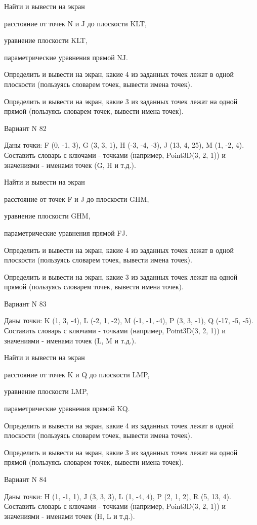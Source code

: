 \documentclass[11pt]{report}
\begin{document}
 
Найти и вывести на экран


расстояние от точек N и J до плоскости KLT,

 
уравнение плоскости KLT,

 
параметрические уравнения прямой NJ.


Определить и вывести на экран, какие 4 из заданных точек лежат в одной плоскости (пользуясь словарем точек, вывести имена точек).


Определить и вывести на экран, какие 3 из заданных точек лежат на одной прямой (пользуясь словарем точек, вывести имена точек).

Вариант N 82

Даны точки: F (0, -1, 3), G (3, 3, 1), H (-3, -4, -3), J (13, 4, 25), M (1, -2, 4).
Составить словарь с ключами - точками (например, Point3D(3, 2, 1)) и значениями - именами точек (G, H и т.д.).

 
Найти и вывести на экран


расстояние от точек F и J до плоскости GHM,

 
уравнение плоскости GHM,

 
параметрические уравнения прямой FJ.


Определить и вывести на экран, какие 4 из заданных точек лежат в одной плоскости (пользуясь словарем точек, вывести имена точек).


Определить и вывести на экран, какие 3 из заданных точек лежат на одной прямой (пользуясь словарем точек, вывести имена точек).

Вариант N 83

Даны точки: K (1, 3, -4), L (-2, 1, -2), M (-1, -1, -4), P (3, 3, -1), Q (-17, -5, -5).
Составить словарь с ключами - точками (например, Point3D(3, 2, 1)) и значениями - именами точек (L, M и т.д.).

 
Найти и вывести на экран


расстояние от точек K и Q до плоскости LMP,

 
уравнение плоскости LMP,

 
параметрические уравнения прямой KQ.


Определить и вывести на экран, какие 4 из заданных точек лежат в одной плоскости (пользуясь словарем точек, вывести имена точек).


Определить и вывести на экран, какие 3 из заданных точек лежат на одной прямой (пользуясь словарем точек, вывести имена точек).

Вариант N 84

Даны точки: H (1, -1, 1), J (3, 3, 3), L (1, -4, 4), P (2, 1, 2), R (5, 13, 4).
Составить словарь с ключами - точками (например, Point3D(3, 2, 1)) и значениями - именами точек (H, L и т.д.).
\end{document}
